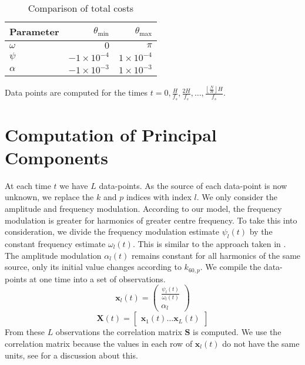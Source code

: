 \begin{table}
    \caption{Comparison of total costs\label{tab:amfmspuriousuniformparams}}
    \begin{center}
        \begin{tabular}{l r r}
            Parameter & $\theta_{\text{min}}$ & $\theta_{\text{max}}$ \\
            \hline
            $\omega$  & $0$ & $\pi$ \\
            $\psi$    & $-1 \times 10^{-4}$ & $1 \times 10^{-4}$ \\
            $\alpha$    & $-1 \times 10^{-3}$ & $1 \times 10^{-3}$ \\
        \end{tabular}
    \end{center}
\end{table}

Data points are computed for the times $t = 0,\frac{H}{f_{s}},\frac{2
H}{f_{s}},\ldots,\frac{\left\lfloor \frac{N}{H} \right\rfloor H}{f_{s}}$.

\section{Computation of Principal Components}

At each time $t$ we have $L$ data-points. As the source of each data-point is
now unknown, we replace the $k$ and $p$ indices with index $l$. We only consider
the amplitude and frequency modulation. According to our model, the frequency
modulation is greater for harmonics of greater centre frequency. To take this
into consideration, we divide the frequency modulation estimate $\psi_{l}(t)$ by
the constant frequency estimate $\omega_{l}(t)$. This is similar to the approach
taken in \cite{creager2016musicalsource}. The amplitude modulation $\alpha_{l}(t)$
remains constant for all harmonics of the same source, only its initial value
changes according to $k_{60,p}$.  We compile the data-points at one time into a
set of observations.
\begin{equation}
    \mathbf{x}_{l}(t) = \begin{pmatrix}
        \frac{\psi_{l}(t)}{\omega_{l}(t)} \\
        \alpha_{l}
    \end{pmatrix}
\end{equation}
\begin{equation}
    \mathbf{X}(t) = \begin{bmatrix}
        \mathbf{x}_{1}(t) \ldots \mathbf{x}_{L}(t)
    \end{bmatrix}
\end{equation}
From these $L$ observations the correlation matrix $\mathbf{S}$ is computed. We
use the correlation matrix because the values in each row of $\mathbf{x}_{l}(t)$
do not have the same units, see \cite[p.~22]{jolliffe2002principal} for a
discussion about this. 

